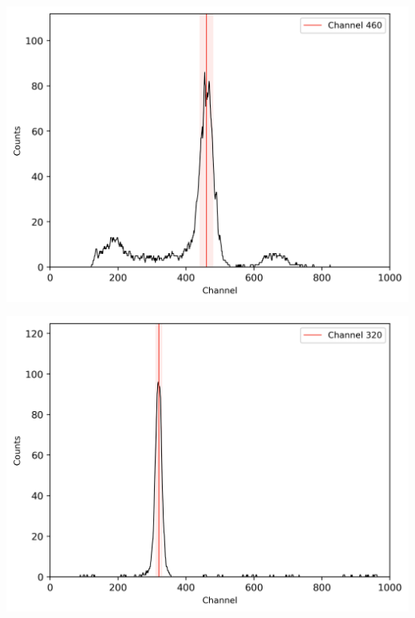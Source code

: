 %
\begin{center}
    \begin{adjustbox}{max width=\linewidth, keepaspectratio}
        \includegraphics[]{png/comptonpeak}
    \end{adjustbox}
    \label{fig:}
\end{center}
%
\begin{center}
    \begin{adjustbox}{max width=\linewidth, keepaspectratio}
        \includegraphics[]{png/60CoZeitspektrum}
    \end{adjustbox}
    \label{fig:}
\end{center}
%
